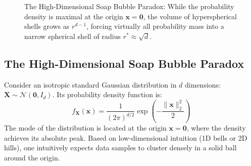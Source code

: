 \begin{figure}[htbp]
\caption{The High-Dimensional Soap Bubble Paradox: While the probability density is maximal at the origin $\mathbf{x} = \mathbf{0}$, the volume of hyperspherical shells grows as $r^{d-1}$, forcing virtually all probability mass into a narrow spherical shell of radius $r^* \approx \sqrt{d}$.}
\label{fig:soap_bubble_paradox}
\end{figure}

\subsection{The High-Dimensional Soap Bubble Paradox}
Consider an isotropic standard Gaussian distribution in $d$ dimensions: $\mathbf{X} \sim \mathcal{N}(\mathbf{0}, I_d)$. Its probability density function is:
\begin{equation}
f_{\mathbf{X}}(\mathbf{x}) = \frac{1}{(2\pi)^{d/2}} \exp\left( -\frac{\|\mathbf{x}\|_2^2}{2} \right)
\end{equation}
The mode of the distribution is located at the origin $\mathbf{x} = \mathbf{0}$, where the density achieves its absolute peak. Based on low-dimensional intuition (1D bells or 2D hills), one intuitively expects data samples to cluster densely in a solid ball around the origin.

